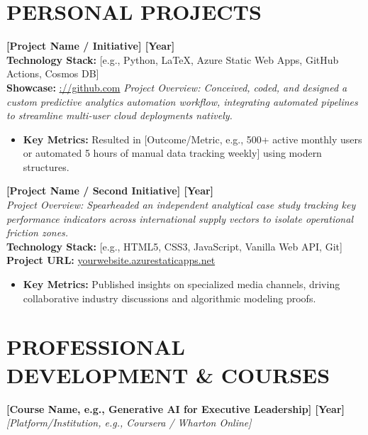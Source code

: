 \documentclass[10pt,a4paper]{article}
\newcommand{\resumeline}{\vspace{-8pt}\noindent\makebox[\linewidth]{\rule{\linewidth}{0.5pt}}\vspace{4pt}}
\begin{document}
	\section*{PERSONAL PROJECTS}
	\resumeline
	
	\noindent \textbf{[Project Name / Initiative] \textbar{} [Year]} \\
	\noindent \textbf{Technology Stack:} [e.g., Python, LaTeX, Azure Static Web Apps, GitHub Actions, Cosmos DB] \\
	\noindent \textbf{Showcase:} \href{https://github.com}{://github.com}
	\noindent \textit{Project Overview: Conceived, coded, and designed a custom predictive analytics automation workflow, integrating automated pipelines to streamline multi-user cloud deployments natively.}	
	\begin{itemize}
		\item \textbf{Key Metrics:} Resulted in [Outcome/Metric, e.g., 500+ active monthly users or automated 5 hours of manual data tracking weekly] using modern structures.
	\end{itemize}
	
	\vspace{6pt}
	
	\noindent \textbf{[Project Name / Second Initiative] \textbar{} [Year]} \\
	\noindent \textit{Project Overview: Spearheaded an independent analytical case study tracking key performance indicators across international supply vectors to isolate operational friction zones.} \\
	\noindent \textbf{Technology Stack:} [e.g., HTML5, CSS3, JavaScript, Vanilla Web API, Git] \\
	\noindent \textbf{Project URL:} \href{https://azurestaticapps.net}{yourwebsite.azurestaticapps.net}
	\begin{itemize}
		\item \textbf{Key Metrics:} Published insights on specialized media channels, driving collaborative industry discussions and algorithmic modeling proofs.
	\end{itemize}
	
	\section*{PROFESSIONAL DEVELOPMENT \& COURSES}
	\resumeline
	
	\noindent \textbf{[Course Name, e.g., Generative AI for Executive Leadership] \textbar{} [Year]} \\
	\noindent \textit{[Platform/Institution, e.g., Coursera / Wharton Online]}
	
\end{document}
